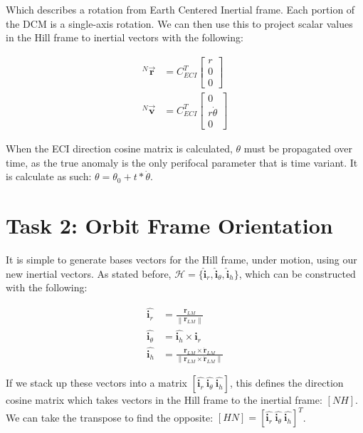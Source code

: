 \documentclass[paper]{aiaaNew}
\newcommand{\norm}[1]{\left\lVert#1\right\rVert}
\begin{document}
Which describes a rotation from Earth Centered Inertial frame. Each portion of the DCM is a single-axis rotation. We can then use this to project scalar values in the Hill frame to inertial vectors with the following:

\begin{align}
  ^N\vec{\bm{r}} &= C_{ECI}^T 
  \begin{bmatrix}
  r \\ 0 \\ 0
  \end{bmatrix} \\
  ^N\vec{\bm{v}} &= C_{ECI}^T
  \begin{bmatrix}
  0 \\ r\dot{\theta} \\ 0
  \end{bmatrix}
\end{align}

When the ECI direction cosine matrix is calculated, $\theta$ must be propagated over time, as the true anomaly is the only perifocal parameter that is time variant. It is calculate as such: $\theta = \theta_0 + t*\dot{\theta}$.







\section*{Task 2: Orbit Frame Orientation}
It is simple to generate bases vectors for the Hill frame, under motion, using our new inertial vectors. As stated before, $\mathcal{H} = \{\bm{\hat{i}}_r, \bm{\hat{i}}_\theta, \bm{\hat{i}}_h \}$, which can be constructed with the following:

\begin{align}
  \hat{\bm{i}_r} &= \frac{\bm{r}_{LM}}{\norm{\bm{r}_{LM}}} \\
  \hat{\bm{i}_\theta} &= \hat{\bm{i}_h} \times \hat{\bm{i}_r} \\
  \hat{\bm{i}_h} &= \frac{\bm{r}_{LM} \times \dot{\bm{r}}_{LM}}{\norm{\bm{r}_{LM} \times \dot{\bm{r}}_{LM}}}
\end{align}

If we stack up these vectors into a matrix $[\hat{\bm{i}_r} \ \hat{\bm{i}_\theta} \ \hat{\bm{i}_h}]$, this defines the direction cosine matrix which takes vectors in the Hill frame to the inertial frame: $[NH]$. We can take the transpose to find the opposite: $[HN] = [\hat{\bm{i}_r} \ \hat{\bm{i}_\theta} \ \hat{\bm{i}_h}]^T$.
\end{document}
